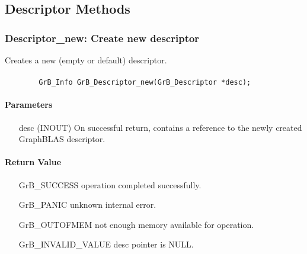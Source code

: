 \subsection{Descriptor Methods}

\subsubsection{{\sf Descriptor\_new}: Create new descriptor}

Creates a new (empty or default) descriptor.

\paragraph{\syntax}

\begin{verbatim}
        GrB_Info GrB_Descriptor_new(GrB_Descriptor *desc);
\end{verbatim}

\paragraph{Parameters}

\begin{itemize}[leftmargin=1.1in]
    \item[{\sf desc}] ({\sf INOUT}) On successful return, contains a 
    reference to the newly created GraphBLAS descriptor.
\end{itemize}

\paragraph{Return Value}

\begin{itemize}[leftmargin=2.1in]
\item[{\sf GrB\_SUCCESS}]           operation completed successfully.
\item[{\sf GrB\_PANIC}]             unknown internal error.
\item[{\sf GrB\_OUTOFMEM}]          not enough memory available for operation.
\item[{\sf GrB\_INVALID\_VALUE}]    {\sf desc} pointer is {\sf NULL}.
\end{itemize}


